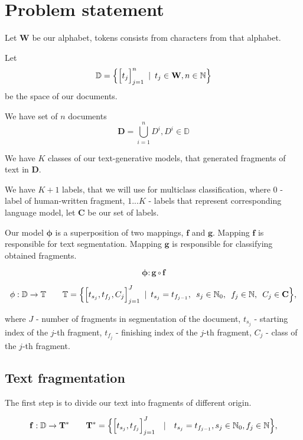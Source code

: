 \documentclass{article}
\newcommand{\Hquad}{\hspace{0.5em}}
\begin{document}
\section{Problem statement}

Let $\mathbf{W}$ be our alphabet, tokens consists from characters from that alphabet.

Let $$\mathbb{D} = \Bigl\{\Big[t_j\Big]_{j=1}^n \Hquad|\Hquad t_j \in \mathbf{W}, n \in \mathbb{N}\Bigr\}$$ be the space of our documents.

We have set of $n$ documents
$$\mathbf{D} = \bigcup_{i=1}^{n}D^i, D^i \in \mathbb{D}$$

We have $K$ classes of our text-generative models, that generated fragments of text in $\mathbf{D}$.

We have $K + 1$ labels, that we will use for multiclass classification, where $0$ - label of human-written fragment, ${1...K}$ - labels that represent corresponding language model, let $\mathbf{C}$ be our set of labels.

Our model $\mathbf{\phi}$ is a superposition of two mappings, $\mathbf{f}$ and $\mathbf{g}$. Mapping $\mathbf{f}$ is responsible for text segmentation. Mapping $\mathbf{g}$ is responsible for classifying obtained fragments.

$$\mathbf{\phi} : \mathbf{g} \circ \mathbf{f}$$


$$\mathbf{\phi}: \mathbb{D} \rightarrow \mathbb{T} \qquad \mathbb{T} = \Bigl\{\Big[t_{s_j}, t_{f_j}, C_j\Big]_{j = 1}^{J} \Hquad|\Hquad t_{s_j} = t_{f_{j - 1}},\Hquad s_j \in \mathbb{N}_0,\Hquad f_j \in \mathbb{N}, \Hquad C_j \in \mathbf{C}\Bigr\},$$

where $J$ - number of fragments in segmentation of the document, $t_{s_j}$ - starting index of the $j$-th fragment,  $t_{f_j}$ - finishing index of the $j$-th fragment,  $C_{j}$ - class of the $j$-th fragment.



\subsection{Text fragmentation}
The first step is to divide our text into fragments of different origin.

$$\mathbf{f}: \mathbb{D} \rightarrow \mathbf{T}^* \qquad \mathbf{T}^* = \Bigl\{\Big[t_{s_j}, t_{f_j}\Big]_{j = 1}^{J}\quad|\quad t_{s_j} = t_{f_{j - 1}}, s_j \in \mathbb{N}_0, f_j \in \mathbb{N}\Bigr\},$$
\end{document}
